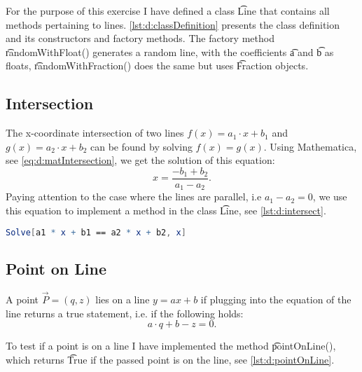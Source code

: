 For the purpose of this exercise I have defined a class \t{Line} that contains all methods pertaining to lines. \autoref{lst:d:classDefinition} presents the class definition and its constructors and factory methods. The factory method \t{randomWithFloat()} generates a random line, with the coefficients \t{a} and \t{b} as floats, \t{randomWithFraction()} does the same but uses \t{Fraction} objects.



\subsection*{Intersection}
	The x-coordinate intersection of two lines $f(x) = a_1 \cdot x + b_1$ and $g(x) = a_2 \cdot x + b_2$ can be found by solving $f(x) = g(x)$. Using Mathematica, see \autoref{eq:d:matIntersection}, we get the solution of this equation:
	\begin{equation}
		x = \frac{-b_1 + b_2}{a_1 - a_2}.
	\end{equation}
	Paying attention to the case where the lines are parallel, i.e $a_1 - a_2 = 0$, we use this equation to implement a method in the class \t{Line}, see \autoref{lst:d:intersect}.

	\begin{lstlisting}[language=Mathematica, float, caption={Mathematica code used to derive an expression for the $x$-coordinate of two lines.}, label={eq:d:matIntersection}]
	Solve[a1 * x + b1 == a2 * x + b2, x]\end{lstlisting}

	

\subsection*{Point on Line}
	A point $\vec{P} = (q,z)$ lies on a line $y = ax +b$ if plugging  into the equation of the line returns a true statement, i.e. if the following holds:
	\begin{equation}
		a \cdot q + b - z = 0.
	\end{equation}

	To test if a point is on a line I have implemented the method \t{pointOnLine()}, which returns \t{True} if the passed point is on the line, see \autoref{lst:d:pointOnLine}. 

